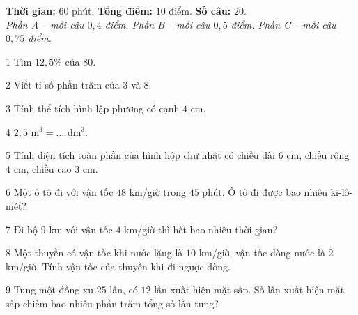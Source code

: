 \begin{knowbox}
\textbf{Thời gian:} $60$ phút. \quad \textbf{Tổng điểm:} $10$ điểm. \quad \textbf{Số câu:} $20$.\\[2pt]\emph{Phần A -- mỗi câu $0{,}4$ điểm. \quad Phần B -- mỗi câu $0{,}5$ điểm. \quad Phần C -- mỗi câu $0{,}75$ điểm.}
\end{knowbox}
\gap
{}
\begin{probbox}{1}{\relax}
Tìm $12{,}5\%$ của $80$.
\end{probbox}
\gap
\begin{probbox}{2}{\relax}
Viết tỉ số phần trăm của $3$ và $8$.
\end{probbox}
\gap
\begin{probbox}{3}{\relax}
Tính thể tích hình lập phương có cạnh $4$ cm.
\end{probbox}
\gap
\begin{probbox}{4}{\relax}
$2{,}5$ m$^3=\ldots$ dm$^3$.
\end{probbox}
\gap
\begin{probbox}{5}{\relax}
Tính diện tích toàn phần của hình hộp chữ nhật có chiều dài $6$ cm, chiều rộng $4$ cm, chiều cao $3$ cm.
\end{probbox}
\gap
\begin{probbox}{6}{\relax}
Một ô tô đi với vận tốc $48$ km/giờ trong $45$ phút. Ô tô đi được bao nhiêu ki-lô-mét?
\end{probbox}
\gap
\begin{probbox}{7}{\relax}
Đi bộ $9$ km với vận tốc $4$ km/giờ thì hết bao nhiêu thời gian?
\end{probbox}
\gap
\begin{probbox}{8}{\relax}
Một thuyền có vận tốc khi nước lặng là $10$ km/giờ, vận tốc dòng nước là $2$ km/giờ. Tính vận tốc của thuyền khi đi ngược dòng.
\end{probbox}
\gap
\begin{probbox}{9}{\relax}
Tung một đồng xu $25$ lần, có $12$ lần xuất hiện mặt sấp. Số lần xuất hiện mặt sấp chiếm bao nhiêu phần trăm tổng số lần tung?
\end{probbox}
